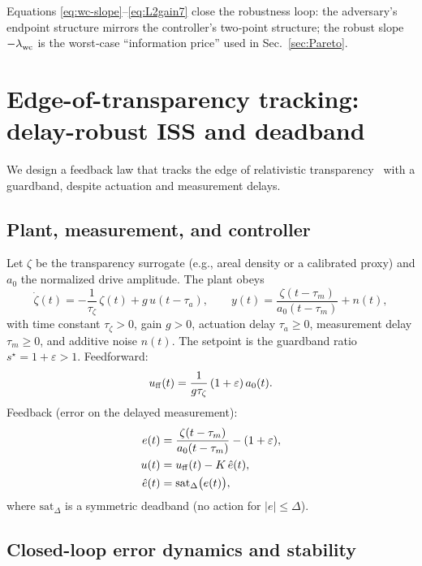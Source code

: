 \documentclass[aps,pre,twocolumn,showpacs,superscriptaddress]{revtex4-2}
\theoremstyle{definition}
\newcommand{\tauz}{\tau_\zeta}
\begin{document}
\medskip
Equations \eqref{eq:wc-slope}–\eqref{eq:L2gain7} close the robustness loop: the adversary’s endpoint structure mirrors the controller’s two‑point structure; the robust slope $-\lambda^{\*}_{\rm wc}$ is the worst‑case ``information price'' used in Sec.~\ref{sec:Pareto}.

\section{Edge-of-transparency tracking: delay-robust ISS and deadband}\label{sec:zeta}

We design a feedback law that tracks the edge of relativistic transparency~\cite{Palaniyappan2012NatPhys} with a guardband, despite actuation and measurement delays.

\subsection{Plant, measurement, and controller}\label{subsec:plant8}

Let $\zeta$ be the transparency surrogate (e.g., areal density or a calibrated proxy) and $a_0$ the normalized drive amplitude. The plant obeys
\begin{equation}\label{eq:plant8}
\dot\zeta(t)= -\frac{1}{\tauz}\,\zeta(t) + g\,u(t-\tau_a),\qquad y(t)=\frac{\zeta(t-\tau_m)}{a_0(t-\tau_m)}+n(t),
\end{equation}
with time constant $\tauz>0$, gain $g>0$, actuation delay $\tau_a\ge 0$, measurement delay $\tau_m\ge 0$, and additive noise $n(t)$. The setpoint is the guardband ratio $s^\star=1+\varepsilon>1$. Feedforward:
\begin{equation}\label{eq:ff8}
u_{\rm ff}(t)=\frac{1}{g\tauz}\,(1+\varepsilon)\,a_0(t).
\end{equation}
Feedback (error on the delayed measurement):
\begin{align}\label{eq:fb8}
e(t)&=\frac{\zeta(t-\tau_m)}{a_0(t-\tau_m)}-(1+\varepsilon),\\
u(t)&=u_{\rm ff}(t)-K\,\hat e(t),\nonumber\\
\hat e(t)&=\mathrm{sat}_\Delta\big(e(t)\big),\nonumber
\end{align}
where $\mathrm{sat}_\Delta$ is a symmetric deadband (no action for $|e|\le \Delta$).

\subsection{Closed-loop error dynamics and stability}\label{subsec:stability8}
\end{document}
